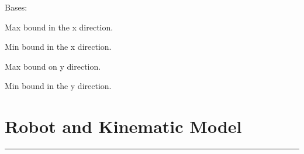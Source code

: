 \documentclass[letterpaper,10pt,english]{sphinxmanual}
\begin{document}
\begin{fulllineitems}
\label{Multi-robot motion planner:planning_sim.Boundary}
Bases: \href{http://docs.python.org/library/functions.html\#object}{}

\begin{fulllineitems}
\label{Multi-robot motion planner:planning_sim.Boundary.x_max}
Max bound in the x direction.

\end{fulllineitems}


\begin{fulllineitems}
\label{Multi-robot motion planner:planning_sim.Boundary.x_min}
Min bound in the x direction.

\end{fulllineitems}


\begin{fulllineitems}
\label{Multi-robot motion planner:planning_sim.Boundary.y_max}
Max bound on y direction.

\end{fulllineitems}


\begin{fulllineitems}
\label{Multi-robot motion planner:planning_sim.Boundary.y_min}
Min bound in the y direction.

\end{fulllineitems}


\end{fulllineitems}



\section{Robot and Kinematic Model}
\label{Multi-robot motion planner:robot-and-kinematic-model}

\bigskip\hrule{}\bigskip
\end{document}
